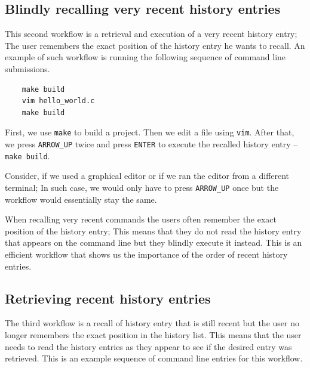 \documentclass[thesis=M,english]{FITthesis}[2012/10/20]
\newcommand{\todotext}[1]{\textcolor{red}{\textbf{[[#1]]}}}
\newcommand{\redtext}[1]{\textcolor{red}{[[#1]]}}
\begin{document}



\subsection{Blindly recalling very recent history entries}

This second workflow is a retrieval and execution of a very recent history entry; The user remembers the exact position of the history entry he wants to recall. An example of such workflow is running the following sequence of command line submissions.
\begin{verbatim}
    make build
    vim hello_world.c
    make build
\end{verbatim}
First, we use \verb|make| to build a project. Then we edit a file using \verb|vim|. After that, we press \verb|ARROW_UP| twice and press \verb|ENTER| to execute the recalled history entry -- \verb|make build|. 

Consider, if we used a graphical editor or if we ran the editor from a different terminal; In such case, we would only have to press \verb|ARROW_UP| once but the workflow would essentially stay the same.

When recalling very recent commands the users often remember the exact position of the history entry; This means that they do not read the history entry that appears on the command line but they blindly execute it instead. This is an efficient workflow that shows us the importance of the order of recent history entries.

\subsection{Retrieving recent history entries}
The third workflow is a recall of history entry that is still recent but the user no longer remembers the exact position in the history list. This means that the user needs to read the history entries as they appear to see if the desired entry was retrieved. This is an example sequence of command line entries for this workflow.
\end{document}
